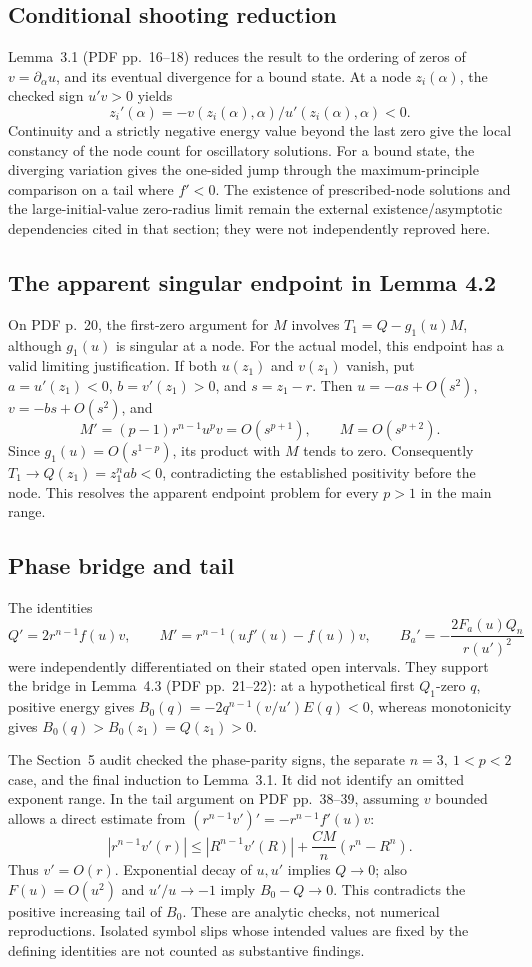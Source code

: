 \documentclass[10pt]{article}
\begin{document}
\subsection*{Conditional shooting reduction}
Lemma 3.1 (PDF pp. 16–18) reduces the result to the ordering of zeros of \(v=\partial_\alpha u\), and its eventual divergence for a bound state. At a node \(z_i(\alpha)\), the checked sign \(u'v>0\) yields \[z_i'(\alpha)=-v(z_i(\alpha),\alpha)/u'(z_i(\alpha),\alpha)<0.\] Continuity and a strictly negative energy value beyond the last zero give the local constancy of the node count for oscillatory solutions. For a bound state, the diverging variation gives the one-sided jump through the maximum-principle comparison on a tail where \(f'<0\). The existence of prescribed-node solutions and the large-initial-value zero-radius limit remain the external existence/asymptotic dependencies cited in that section; they were not independently reproved here.\par
\subsection*{The apparent singular endpoint in Lemma 4.2}
On PDF p. 20, the first-zero argument for \(M\) involves \(T_1=Q-g_1(u)M\), although \(g_1(u)\) is singular at a node. For the actual model, this endpoint has a valid limiting justification. If both \(u(z_1)\) and \(v(z_1)\) vanish, put \(a=u'(z_1)<0\), \(b=v'(z_1)>0\), and \(s=z_1-r\). Then \(u=-as+O(s^2)\), \(v=-bs+O(s^2)\), and \[M'=(p-1)r^{n-1}u^pv=O(s^{p+1}),\qquad M=O(s^{p+2}).\] Since \(g_1(u)=O(s^{1-p})\), its product with \(M\) tends to zero. Consequently \(T_1\to Q(z_1)=z_1^nab<0\), contradicting the established positivity before the node. This resolves the apparent endpoint problem for every \(p>1\) in the main range.\par
\subsection*{Phase bridge and tail}
The identities \[Q'=2r^{n-1}f(u)v,\qquad
 M'=r^{n-1}(uf'(u)-f(u))v,\qquad
 B_a'=-\frac{2F_a(u)Q_n}{r(u')^2}\] were independently differentiated on their stated open intervals. They support the bridge in Lemma 4.3 (PDF pp. 21–22): at a hypothetical first \(Q_1\)-zero \(q\), positive energy gives \(B_0(q)=-2q^{n-1}(v/u')E(q)<0\), whereas monotonicity gives \(B_0(q)>B_0(z_1)=Q(z_1)>0\).\par
The Section 5 audit checked the phase-parity signs, the separate \(n=3,\ 1<p<2\) case, and the final induction to Lemma 3.1. It did not identify an omitted exponent range. In the tail argument on PDF pp. 38–39, assuming \(v\) bounded allows a direct estimate from \((r^{n-1}v')'=-r^{n-1}f'(u)v\): \[|r^{n-1}v'(r)|
 \le |R^{n-1}v'(R)|+\frac{CM}{n}(r^n-R^n).\] Thus \(v'=O(r)\). Exponential decay of \(u,u'\) implies \(Q\to0\); also \(F(u)=O(u^2)\) and \(u'/u\to-1\) imply \(B_0-Q\to0\). This contradicts the positive increasing tail of \(B_0\). These are analytic checks, not numerical reproductions. Isolated symbol slips whose intended values are fixed by the defining identities are not counted as substantive findings.\par
\end{document}
